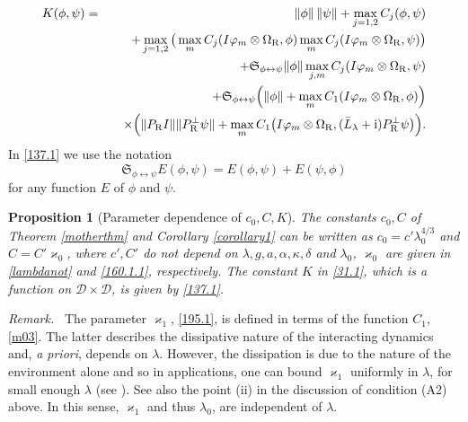 \documentclass[letterpaper,onecolumn,11pt,accepted=2021-12-09]{quantumarticle}
\numberwithin{equation}{section}
\newcounter{resultcounter}[section]
\newtheorem{prop}[resultcounter]{Proposition}
\newcommand{\sym}{ {\mathfrak S}_{\phi\leftrightarrow\psi}}
\renewcommand{\r}{{\rm R}}
\renewcommand{\i}{{\rm i}}
\begin{document}
\begin{eqnarray}
	K(\phi,\psi) &=& \|\phi\|\,\|\psi\| + \max_{j=1,2} C_j(\phi,\psi)\nonumber \\
	&& +\max_{j=1,2} \big( \max_m C_j(I\varphi_m\otimes\Omega_\r,\phi) \max_m C_j(I\varphi_m\otimes\Omega_\r,\psi)\big)\nonumber\\
	&&+  \sym \|\phi\| \max_{j,m}C_j(I\varphi_m\otimes\Omega_\r, \psi)\nonumber\\
	&&  +  \sym \Big( \|\phi\| +\max_m C_1(I\varphi_m\otimes\Omega_\r, \phi)\Big)\nonumber\\
	&&\quad \times \Big(  \|P_\r I\|  \|P^\perp_\r\psi\|+ \max_m C_1\big(I\varphi_m\otimes\Omega_\r,(\bar L_\lambda+\i)P^\perp_\r\psi\big) \Big).
	\label{137.1}
\end{eqnarray}
In \eqref{137.1} we use the notation
\begin{equation}
\sym E(\phi,\psi) = E(\phi,\psi)+E(\psi,\phi)
\label{40} 
\end{equation}
for any function $E$ of $\phi$ and $\psi$. 

\begin{prop} [Parameter dependence of $c_0,C, K$] 
	\label{prop2}
The constants $c_0, C$ of Theorem \ref{motherthm} and Corollary \ref{corollary1} can be written as $c_0=c'\lambda_0^{4/3}$ and $C=C'\varkappa_0$, where $c', C'$ do not depend on $\lambda, g, a, \alpha, \kappa, \delta$ and $\lambda_0$, $\varkappa_0$ are given in \eqref{lambdanot} and \eqref{160.1.1}, respectively. The constant $K$ in \eqref{31.1}, which is a function on ${\mathcal D}\times{\mathcal D}$, is given by \eqref{137.1}.
\end{prop}



{\em Remark.\ } The parameter $\varkappa_1$,  \eqref{195.1}, is defined in terms of the function $C_1$, \eqref{m03}. The latter describes the dissipative nature of the interacting dynamics and, {\em a priori}, depends on $\lambda$. However, the dissipation is due to the nature of the environment alone and so in applications, one can bound $\varkappa_1$ uniformly in $\lambda$, for small enough $\lambda$ (see \cite{Markov2}). See also the point (ii) in the discussion of condition (A2) above. In this sense, $\varkappa_1$ and thus $\lambda_0$, are independent of $\lambda$. 
\bigskip
\end{document}

